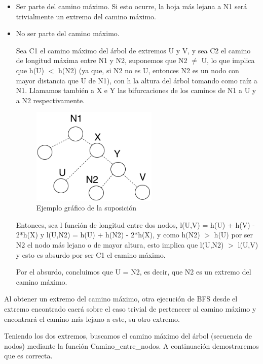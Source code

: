 \documentclass[a4paper, 10pt, twoside]{article}
\begin{document}
\begin{itemize}
  \item Ser parte del camino máximo. Si esto ocurre, la hoja más lejana a N1 será trivialmente un extremo del camino máximo.
  \item No ser parte del camino máximo.
  
  Sea C1 el camino máximo del árbol de extremos U y V, y sea C2 el camino de longitud máxima entre N1 y N2, suponemos que N2 $\neq$ U, lo que implica que h(U) $<$ h(N2) (ya que, si N2 no es U, entonces N2 es un nodo con mayor distancia que U de N1), con h la altura del árbol tomando como raíz a N1. Llamamos también a X e Y las bifurcaciones de los caminos de N1 a U y a N2 respectivamente.

\begin{figure}[ht!]
\centering
\includegraphics[width=60mm]{2b.png}
\caption{Ejemplo gráfico de la suposición}
\label{overflow}
\end{figure}  
  
  Entonces, sea l función de longitud entre dos nodos, l(U,V) = h(U) + h(V) - 2*h(X) y l(U,N2) = h(U) + h(N2) - 2*h(X), y como h(N2) $>$ h(U) por ser N2 el nodo más lejano o de mayor altura, esto implica que l(U,N2) $>$ l(U,V) y esto es absurdo por ser C1 el camino máximo.
  
  Por el absurdo, concluimos que U = N2, es decir, que N2 es un extremo del camino máximo.
\end{itemize}

Al obtener un extremo del camino máximo, otra ejecución de BFS desde el extremo encontrado caerá sobre el caso trivial de pertenecer al camino máximo y encontrará el camino más lejano a este, su otro extremo.

Teniendo los dos extremos, buscamos el camino máximo del árbol (secuencia de nodos) mediante la función Camino\_entre\_nodos. A continuación demostraremos que es correcta.
\end{document}

